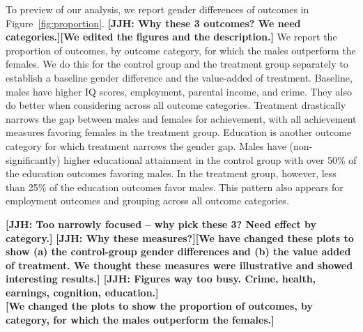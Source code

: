 To preview of our analysis, we report gender differences of outcomes in Figure~\ref{fig:proportion}. \textbf{[JJH: Why these 3 outcomes? We need categories.][We edited the figures and the description.]} We report the proportion of outcomes, by outcome category, for which the males outperform the females. We do this for the control group and the treatment group separately to establish a baseline gender difference and the value-added of treatment. Baseline, males have higher IQ scores, employment, parental income, and crime. They also do better when considering across all outcome categories. Treatment drastically narrows the gap between males and females for achievement, with all achievement measures favoring females in the treatment group. Education is another outcome category for which treatment narrows the gender gap. Males have (non-significantly) higher educational attainment in the control group with over 50\% of the education outcomes favoring males. In the treatment group, however, less than 25\% of the education outcomes favor males. This pattern also appears for employment outcomes and grouping across all outcome categories. 

\textbf{[JJH: Too narrowly focused -- why pick these 3? Need effect by category.]}
\textbf{[JJH: Why these measures?][We have changed these plots to show (a) the control-group gender differences and (b) the value added of treatment. We thought these measures were illustrative and showed interesting results.] [JJH: Figures way too busy. Crime, health, earnings, cognition, education.]} \\
\textbf{[We changed the plots to show the proportion of outcomes, by category, for which the males outperform the females.]}

